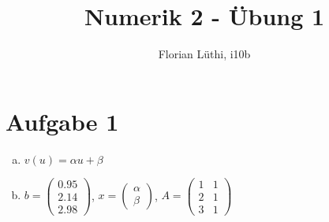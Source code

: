 \documentclass[11pt]{article} %
\title{Numerik 2 - Übung 1}
\author{Florian Lüthi, i10b}
\begin{document}
\maketitle

\section*{Aufgabe 1}

\begin{enumerate}[a)]
\item $ v(u) = \alpha u + \beta $

\item
$ b = \begin{pmatrix} 0.95 \\ 2.14 \\ 2.98  \end{pmatrix} $, $ x = \begin{pmatrix} \alpha \\ \beta \end{pmatrix} $, $ A = \begin{pmatrix} 1 & 1 \\ 2 & 1 \\ 3 & 1 \end{pmatrix} $


\end{enumerate}
\end{document}

